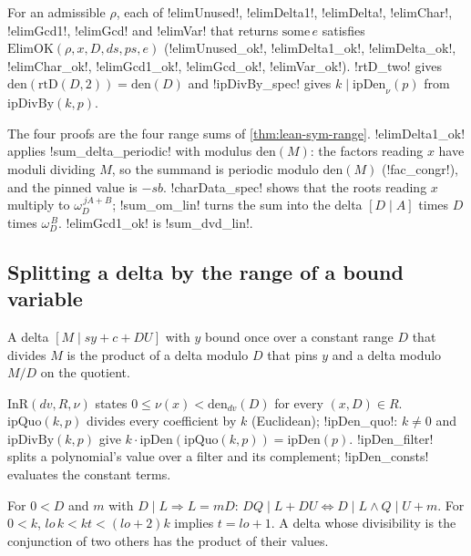 \begin{theorem}\label{thm:lean-sym-elimok}
For an admissible $\rho$, each of \lean!elimUnused!, \lean!elimDelta1!, \lean!elimDelta!, \lean!elimChar!, \lean!elimGcd1!, \lean!elimGcd! and \lean!elimVar! that returns $\mathrm{some}\,e$ satisfies $\mathrm{ElimOK}(\rho,x,D,ds,ps,e)$ (\lean!elimUnused_ok!, \lean!elimDelta1_ok!, \lean!elimDelta_ok!, \lean!elimChar_ok!, \lean!elimGcd1_ok!, \lean!elimGcd_ok!, \lean!elimVar_ok!). \lean!rtD_two! gives $\mathrm{den}(\mathrm{rtD}(D,2))=\mathrm{den}(D)$ and \lean!ipDivBy_spec! gives $k\mid\mathrm{ipDen}_\nu(p)$ from $\mathrm{ipDivBy}(k,p)$.
\end{theorem}

The four proofs are the four range sums of \cref{thm:lean-sym-range}. \lean!elimDelta1_ok! applies \lean!sum_delta_periodic! with modulus $\mathrm{den}(M)$: the factors reading $x$ have moduli dividing $M$, so the summand is periodic modulo $\mathrm{den}(M)$ (\lean!fac_congr!), and the pinned value is $-sb$. \lean!charData_spec! shows that the roots reading $x$ multiply to $\omega_D^{\,jA+B}$; \lean!sum_om_lin! turns the sum into the delta $[D\mid A]$ times $D$ times $\omega_D^{\,B}$. \lean!elimGcd1_ok! is \lean!sum_dvd_lin!.

\subsection{Splitting a delta by the range of a bound variable}\label{sec:lean-sym-split-delta}

A delta $[M\mid sy+c+DU]$ with $y$ bound once over a constant range $D$ that divides $M$ is the product of a delta modulo $D$ that pins $y$ and a delta modulo $M/D$ on the quotient.

\begin{definition}
$\mathrm{InR}(dv,R,\nu)$ states $0\le\nu(x)<\mathrm{den}_{dv}(D)$ for every $(x,D)\in R$. $\mathrm{ipQuo}(k,p)$ divides every coefficient by $k$ (Euclidean); \lean!ipDen_quo!: $k\ne0$ and $\mathrm{ipDivBy}(k,p)$ give $k\cdot\mathrm{ipDen}(\mathrm{ipQuo}(k,p))=\mathrm{ipDen}(p)$. \lean!ipDen_filter! splits a polynomial's value over a filter and its complement; \lean!ipDen_consts! evaluates the constant terms.
\end{definition}

\begin{proposition}
For $0<D$ and $m$ with $D\mid L\Rightarrow L=mD$: $DQ\mid L+DU\iff D\mid L\land Q\mid U+m$. For $0<k$, $lo\,k<kt<(lo+2)k$ implies $t=lo+1$. A delta whose divisibility is the conjunction of two others has the product of their values.
\end{proposition}

